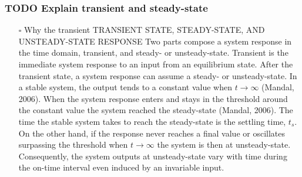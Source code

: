 \documentclass{article}
\begin{document}
\subsubsection{TODO Explain transient and steady-state}
\label{sec:org2598025}
\begin{itemize}
\item[{$\square$}] Why the transient
TRANSIENT STATE, STEADY-STATE, AND UNSTEADY-STATE RESPONSE
Two parts compose a system response in the time domain, transient, and steady- or unsteady-state.
Transient is the immediate system response to an input from an equilibrium state.
After the transient state, a system response can assume a steady- or unsteady-state.
In a stable system, the output tends to a constant value when \(t→∞\) (Mandal, 2006).
When the system response enters and stays in the threshold around the constant value the system reached the steady-state (Mandal, 2006).
The time the stable system takes to reach the steady-state is the settling time, \(t_s\).
On the other hand, if the response never reaches a final value or oscillates surpassing the threshold when \(t→∞\) the system is then at unsteady-state.
Consequently, the system outputs at unsteady-state vary with time during the on-time interval even induced by an invariable input.
\end{itemize}
\end{document}
